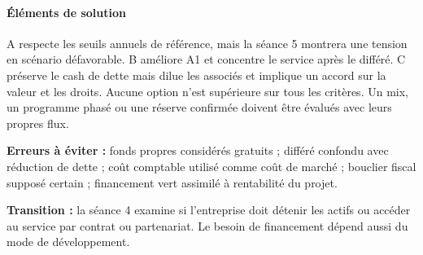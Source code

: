 \documentclass[12pt,a4paper]{article}
\begin{document}
\paragraph{Éléments de solution}
A respecte les seuils annuels de référence, mais la séance 5 montrera une tension en scénario défavorable. B améliore A1 et concentre le service après le différé. C préserve le cash de dette mais dilue les associés et implique un accord sur la valeur et les droits. Aucune option n’est supérieure sur tous les critères. Un mix, un programme phasé ou une réserve confirmée doivent être évalués avec leurs propres flux.


\textbf{Erreurs à éviter :} fonds propres considérés gratuits ; différé confondu avec réduction de dette ; coût comptable utilisé comme coût de marché ; bouclier fiscal supposé certain ; financement vert assimilé à rentabilité du projet.


\textbf{Transition :} la séance 4 examine si l’entreprise doit détenir les actifs ou accéder au service par contrat ou partenariat. Le besoin de financement dépend aussi du mode de développement.
\end{document}
